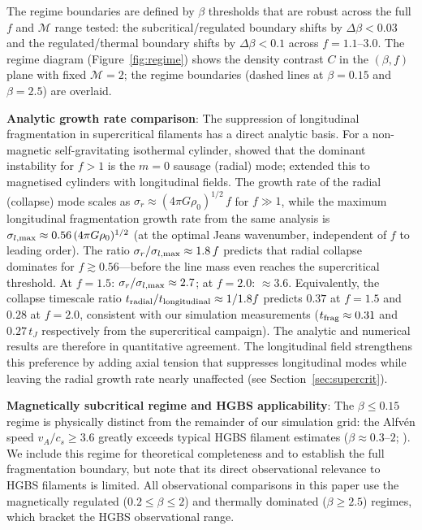 \documentclass[twoside,twocolumn]{mnras}
\begin{document}
The regime boundaries are defined by $\beta$ thresholds that are robust across the full $f$ and $\mathcal{M}$ range tested: the subcritical/regulated boundary shifts by $\Delta\beta < 0.03$ and the regulated/thermal boundary shifts by $\Delta\beta < 0.1$ across $f = 1.1$--$3.0$. The regime diagram (Figure~\ref{fig:regime}) shows the density contrast $C$ in the $(\beta, f)$ plane with fixed $\mathcal{M} = 2$; the regime boundaries (dashed lines at $\beta = 0.15$ and $\beta = 2.5$) are overlaid.

\textbf{Analytic growth rate comparison}: The suppression of longitudinal fragmentation in
supercritical filaments has a direct analytic basis. For a non-magnetic self-gravitating
isothermal cylinder, \citet{Stodolkiewicz1963} showed that the dominant instability for
$f > 1$ is the $m=0$ sausage (radial) mode; \citet{Nagasawa1987} extended this to magnetised
cylinders with longitudinal fields. The growth rate of the radial (collapse) mode scales as
$\sigma_r \approx (4\pi G\rho_0)^{1/2}\,f$ for $f \gg 1$, while the maximum longitudinal
fragmentation growth rate from the same analysis is $\sigma_{l,\rm max} \approx
0.56\,(4\pi G\rho_0)^{1/2}$ (at the optimal Jeans wavenumber, independent of $f$ to leading
order). The ratio $\sigma_r/\sigma_{l,\rm max} \approx 1.8\,f$ predicts that radial collapse
dominates for $f \gtrsim 0.56$---before the line mass even reaches the supercritical threshold.
At $f = 1.5$: $\sigma_r/\sigma_{l,\rm max} \approx 2.7$; at $f = 2.0$: ${\approx}3.6$.
Equivalently, the collapse timescale ratio $t_{\rm radial}/t_{\rm longitudinal} \approx 1/1.8f$
predicts $0.37$ at $f = 1.5$ and $0.28$ at $f = 2.0$, consistent with our simulation
measurements ($t_{\rm frag} \approx 0.31$ and $0.27\,t_J$ respectively from the supercritical
campaign). The analytic and numerical results are therefore in quantitative agreement.
The longitudinal field strengthens this preference by adding axial tension that suppresses
longitudinal modes while leaving the radial growth rate nearly unaffected (see
Section~\ref{sec:supercrit}).

\textbf{Magnetically subcritical regime and HGBS applicability}:
The $\beta \leq 0.15$ regime is physically distinct from the remainder of our simulation
grid: the Alfv\'{e}n speed $v_A/c_s \geq 3.6$ greatly exceeds typical HGBS filament
estimates ($\beta \approx 0.3$--$2$; \citealt{Planck2016, Pattle2018, Crutcher2012}).
We include this regime for theoretical completeness and to establish the full fragmentation
boundary, but note that its direct observational relevance to HGBS filaments is limited.
All observational comparisons in this paper use the magnetically regulated ($0.2 \leq \beta \leq 2$)
and thermally dominated ($\beta \geq 2.5$) regimes, which bracket the HGBS observational range.
\end{document}
